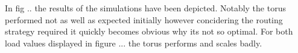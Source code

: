 \documentclass[journal,10pt,twoside, a4paper]{IEEEtran}
\begin{document}
In fig ..  the results of the simulations have been depicted. Notably the torus performed not as well as expected initially however concidering the routing strategy required it quickly becomes obvious why its not so optimal. For both load values displayed in figure ...  the torus performs and scales badly.  
\end{document}
